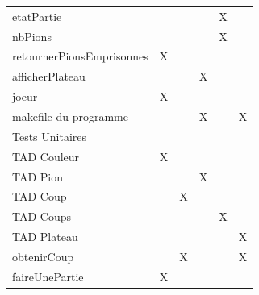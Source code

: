 \documentclass{article}
\begin{document}
\begin{tabular}{|l|c|c|c|c|c|}
  etatPartie & & & & X & \\
  nbPions & & & & X & \\
  retournerPionsEmprisonnes & X & & & & \\
  afficherPlateau & & & X & & \\
  joeur & X & & & & \\
  makefile du programme & & & X & & X \\
  \hline
  Tests Unitaires \\
  \hline
  TAD Couleur & X & & & & \\                                                                                                                                                                       
  TAD Pion & & & X & & \\                                                                                                                                                                              
  TAD Coup & & X & &  & \\                                                                                                                                                                              
  TAD Coups & & & & X & \\                                                                                                                                                                             
  TAD Plateau & & & & & X \\
  obtenirCoup & & X & & & X \\
  faireUnePartie & X & & & & \\
  \hline
\end{tabular}             
\end{document}
